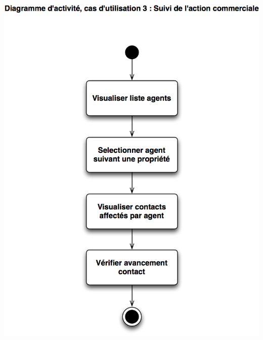 \begin {center}
\includegraphics[width=\textwidth]{../../diagrammeActivite/DACU3.png}

\end{center}
